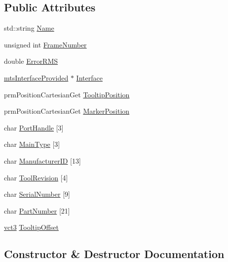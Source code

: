 \subsection*{Public Attributes}
\begin{DoxyCompactItemize}
\item 
std\+::string \hyperlink{classmts_n_d_i_serial_1_1_tool_a4c87311466326771f75531a83935c208}{Name}
\item 
unsigned int \hyperlink{classmts_n_d_i_serial_1_1_tool_a310bebd3b9eda41d482edbb983195a10}{Frame\+Number}
\item 
double \hyperlink{classmts_n_d_i_serial_1_1_tool_ad4282be66b1ffaf250d51fb9305395e7}{Error\+R\+M\+S}
\item 
\hyperlink{classmts_interface_provided}{mts\+Interface\+Provided} $\ast$ \hyperlink{classmts_n_d_i_serial_1_1_tool_ae39df6f4194b4be33310019ccee4bf73}{Interface}
\item 
prm\+Position\+Cartesian\+Get \hyperlink{classmts_n_d_i_serial_1_1_tool_aef4e9c123a79afda4c764d27faeac338}{Tooltip\+Position}
\item 
prm\+Position\+Cartesian\+Get \hyperlink{classmts_n_d_i_serial_1_1_tool_ab8a5ef4c88fdb0420aff4ef6354570bf}{Marker\+Position}
\item 
char \hyperlink{classmts_n_d_i_serial_1_1_tool_a9b445b958cbf2eb2058d1eb56df30da5}{Port\+Handle} \mbox{[}3\mbox{]}
\item 
char \hyperlink{classmts_n_d_i_serial_1_1_tool_a3b9ca4cfc7d81dc34e483a96e4a86056}{Main\+Type} \mbox{[}3\mbox{]}
\item 
char \hyperlink{classmts_n_d_i_serial_1_1_tool_ade34454fc0c511fefd3cd5db7332734b}{Manufacturer\+I\+D} \mbox{[}13\mbox{]}
\item 
char \hyperlink{classmts_n_d_i_serial_1_1_tool_aadd9c102dca4f53e5ea50188ddebc9e0}{Tool\+Revision} \mbox{[}4\mbox{]}
\item 
char \hyperlink{classmts_n_d_i_serial_1_1_tool_a454c6a43d24c1b0e50ff94b3f43e272a}{Serial\+Number} \mbox{[}9\mbox{]}
\item 
char \hyperlink{classmts_n_d_i_serial_1_1_tool_a80a1f0ea33d2f23349edb5fc58a4c388}{Part\+Number} \mbox{[}21\mbox{]}
\item 
\hyperlink{vct_fixed_size_vector_types_8h_a3af82acdbf4eeb73c551909240b106ea}{vct3} \hyperlink{classmts_n_d_i_serial_1_1_tool_aa8acfe8b5a76a1fc7816233d6f853049}{Tooltip\+Offset}
\end{DoxyCompactItemize}


\subsection{Constructor \& Destructor Documentation}
\hypertarget{classmts_n_d_i_serial_1_1_tool_a39a0ab6a716a320766ed0eb059aba993}{}
